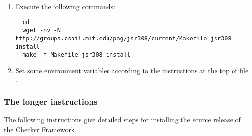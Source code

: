 \begin{enumerate}

\item
  Execute the following commands:

\begin{Verbatim}
  cd
  wget -nv -N http://groups.csail.mit.edu/pag/jsr308/current/Makefile-jsr308-install
  make -f Makefile-jsr308-install
\end{Verbatim}

\item
Set some environment variables according to the instructions at the top of file
.

\end{enumerate}


\subsubsection{The longer instructions}

The following instructions give detailed steps for installing the source
release of the Checker Framework.

